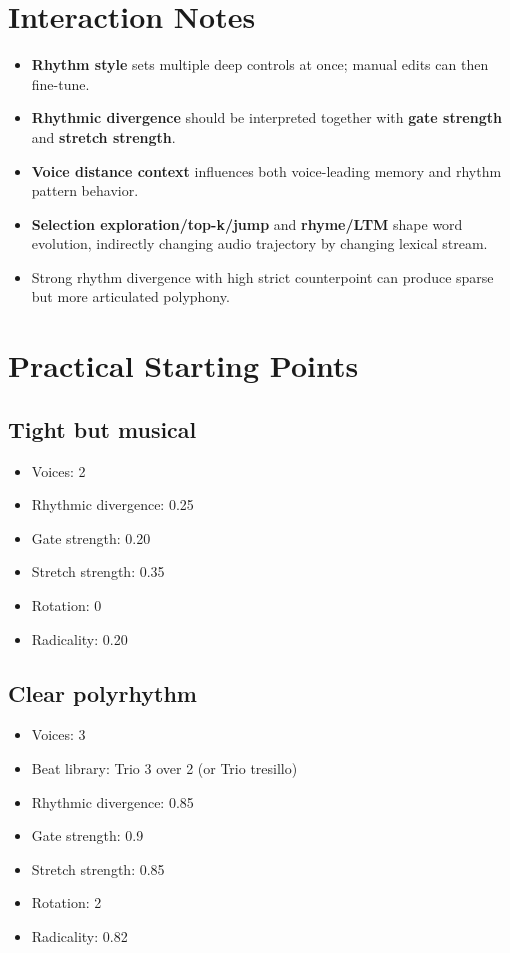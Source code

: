 \documentclass[11pt,a4paper]{article}
\begin{document}
\section{Interaction Notes}
\begin{itemize}
  \item \textbf{Rhythm style} sets multiple deep controls at once; manual edits can then fine-tune.
  \item \textbf{Rhythmic divergence} should be interpreted together with \textbf{gate strength} and \textbf{stretch strength}.
  \item \textbf{Voice distance context} influences both voice-leading memory and rhythm pattern behavior.
  \item \textbf{Selection exploration/top-k/jump} and \textbf{rhyme/LTM} shape word evolution, indirectly changing audio trajectory by changing lexical stream.
  \item Strong rhythm divergence with high strict counterpoint can produce sparse but more articulated polyphony.
\end{itemize}

\section{Practical Starting Points}
\subsection*{Tight but musical}
\begin{itemize}
  \item Voices: 2
  \item Rhythmic divergence: 0.25
  \item Gate strength: 0.20
  \item Stretch strength: 0.35
  \item Rotation: 0
  \item Radicality: 0.20
\end{itemize}

\subsection*{Clear polyrhythm}
\begin{itemize}
  \item Voices: 3
  \item Beat library: Trio 3 over 2 (or Trio tresillo)
  \item Rhythmic divergence: 0.85
  \item Gate strength: 0.9
  \item Stretch strength: 0.85
  \item Rotation: 2
  \item Radicality: 0.82
\end{itemize}
\end{document}
